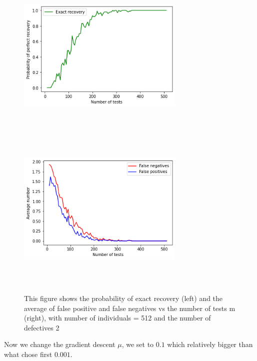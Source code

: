 \begin{figure}[H]\label{exat1}
	\includegraphics[height=8cm, width=8cm]{images/512ex}
	\includegraphics[height=8cm, width=8cm]{images/512fal}
	\caption{This figure shows the probability of exact recovery (left) and  the average of false positive and false negatives vs the number of tests m (right), with number of individuals  = 512 and the number of defectives 2}
\end{figure}

Now we change the gradient descent $ \mu $, we set to $ 0.1 $ which relatively bigger than what chose first $ 0.001 $.

